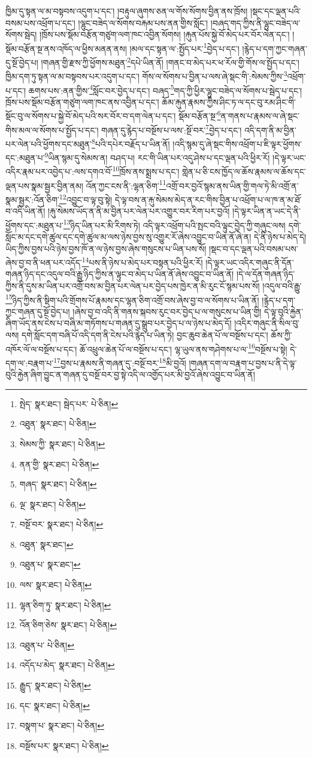 ཁྱིམ་དུ་སྟན་ལ་མ་བསྟབས་འདུག་པ་དང་། །བརྟུལ་ཞུགས་ཅན་ལ་གོས་སོགས་བྱིན་ནས་ཁྲོས། །སྡང་དང་ལྡན་པའི་བསམ་པས་འཕྲོག་པ་དང་། །ལྷུང་བཟེད་ལ་སོགས་བརྐམ་པས་ནན་གྱིས་སློང་། །བཞད་གད་ཀྱིས་ནི་ལྷུང་བཟེད་ལ་སོགས་སྦེད། །ཁྲོས་པས་སྡོམ་བརྩོན་གཙུག་ལག་ཁང་འབྱིན་སོགས། །རྐུན་པོས་སྐྱེ་བོ་མེད་པར་བོར་ལེན་དང་། །སྡོམ་བརྩོན་སྔ་ནས་འཁོད་ལ་ཕྱིས་མནན་ནས། །མལ་དང་སྟན་ལ་:སྤྱོད་པར་\footnote{སྤེད་  སྣར་ཐང་། སྦེད་པར་  པེ་ཅིན། }བྱེད་པ་དང་། །རྙེད་པ་དག་ཀྱང་གཞན་དུ་སྔོ་བྱེད་པ། །གཞན་གྱི་རྫས་ཀྱི་ཕྱོགས་མཐུན་\footnote{འཐུན་  སྣར་ཐང་།  པེ་ཅིན། }དཔེ་ཡིན་ནོ། །གནང་བ་མེད་པར་ཕ་རོལ་གྱི་གོས་ལ་སྤྱོད་པ་དང་། ཁྱིམ་དག་ཏུ་སྟན་ལ་མ་བསྟབས་པར་འདུག་པ་དང་། གོས་ལ་སོགས་པ་བྱིན་པ་ལས་ཞེ་སྡང་གི་:སེམས་ཀྱིས་\footnote{སེམས་ཀྱི་  སྣར་ཐང་།  པེ་ཅིན། }འཕྲོག་པ་དང་། ཆགས་པས་:ནན་གྱིས་\footnote{ནན་གྱི་  སྣར་ཐང་།  པེ་ཅིན། }སློང་བར་བྱེད་པ་དང་། བཞད་\footnote{གཞད་  སྣར་ཐང་།  པེ་ཅིན། }གད་ཀྱི་ཕྱིར་ལྷུང་བཟེད་ལ་སོགས་པ་སྦེད་པ་དང་། ཁྲོས་པས་སྡོམ་བརྩོན་གཙུག་ལག་ཁང་ནས་འབྱིན་པ་དང་། ཆོམ་རྐུན་རྣམས་ཀྱིས་ཤིང་ཏ་ལ་དང་བུ་རམ་ཤིང་གི་སྡོང་བུ་ལ་སོགས་པ་སྐྱེ་བོ་མེད་པའི་སར་བོར་བ་དག་ལེན་པ་དང་། སྡོམ་བརྩོན་སྔ་\footnote{ལྔ་  སྣར་ཐང་།  པེ་ཅིན། }ན་གནས་པ་རྣམས་ལ་ཞེ་སྡང་གིས་མལ་ལ་སོགས་པ་སྤྱོད་པ་དང་། གཞན་དུ་རྙེད་པ་བསྔོས་པ་ལས་:སྔོ་བར་\footnote{བསྔོ་བར་  སྣར་ཐང་།  པེ་ཅིན། }བྱེད་པ་དང་། འདི་དག་ནི་མ་བྱིན་པར་ལེན་པའི་ཕྱོགས་དང་མཐུན་\footnote{འཐུན་  སྣར་ཐང་། }པའི་དཔེར་བརྗོད་པ་ཡིན་ནོ། །འདི་སྙམ་དུ་ཞེ་སྡང་གིས་འཕྲོག་པ་ཇི་ལྟར་ཕྱོགས་དང་:མཐུན་པ་\footnote{འཐུན་པ་  སྣར་ཐང་། }ཡིན་སྙམ་དུ་སེམས་ན། བཤད་པ། རང་གི་ཡིན་པར་འདུ་ཤེས་པ་དང་ལྡན་པའི་ཕྱིར་རོ། །དེ་ལྟར་ཡང་འདིར་རྣམ་པར་འབྱེད་པ་:ལས་དགའ་བོ་\footnote{ལས་  སྣར་ཐང་།  པེ་ཅིན། }ཁྲོས་ནས་སྨྲས་པ་དང་། གླེན་པ་ཅི་ངས་ཁྱོད་ལ་ཆོས་རྣམས་ལ་ཆོས་དང་ལྡན་པས་སྣམ་སྦྱར་བྱིན་ནམ། འོན་ཀྱང་ངས་ནི་:ལྷན་ཅིག་\footnote{ལྷན་ཅིག་ཏུ་  སྣར་ཐང་།  པེ་ཅིན། }འགྲོ་བར་བྱའོ་སྙམ་ནས་ཡིན་གྱི་གལ་ཏེ་མི་འགྲོ་ན་སྣམ་སྦྱར་:འོན་ཅིག་\footnote{འོན་ཅིག་ཅེས་  སྣར་ཐང་།  པེ་ཅིན། }འབྱུང་བ་ལྟ་བུ་སྟེ། དེ་ལྟ་བས་ན་རྐུ་སེམས་མེད་ན་རང་གིས་བྱིན་པ་འཕྲོག་པ་ལ་ཁ་ན་མ་ཐོ་བ་འདི་ཡིན་ནོ། །རྐུ་སེམས་ཡོད་ན་ནི་མ་བྱིན་པར་ལེན་པར་འགྱུར་བར་རིག་པར་བྱའོ། །དེ་ལྟར་ཡིན་ན་ཡང་དེ་ནི་ཕྱོགས་དང་:མཐུན་པ་\footnote{འཐུན་པ་  པེ་ཅིན། }ཉིད་ཡིན་པར་མི་རིགས་ཏེ། འདི་ལྟར་འཕྲོག་པའི་སྤང་བའི་ལྟུང་བྱེད་ཀྱི་གཞུང་ལས། དགེ་སློང་མ་དང་དགེ་ཚུལ་དང་དགེ་ཚུལ་མ་ལས་ཉེས་བྱས་སུ་འགྱུར་རོ་ཞེས་འབྱུང་བ་ཡིན་ནོ་ཞེ་ན། དེ་ནི་ཉེས་པ་མེད་དེ། ཡིད་ཀྱིས་བྱས་པའི་ཉེས་བྱས་ཁོ་ན་ལ་ཉེས་བྱས་ཞེས་གསུངས་པ་ཡིན་པས་སོ། །སྡང་བ་དང་ལྡན་པའི་བསམ་པས་ཞེས་བྱ་བ་ནི་ཕན་པར་འདོད་\footnote{འདོད་པ་མེད་  སྣར་ཐང་།  པེ་ཅིན། }པས་ནི་ཉེས་པ་མེད་པར་བསྟན་པའི་ཕྱིར་རོ། །དེ་ལྟར་ཡང་འདིར་གཞུང་ནི་དོན་གཞན་ཉིད་དང་འདུལ་བའི་རྒྱུ་ཉིད་ཀྱིས་ན་ལྟུང་བ་མེད་པ་ཡིན་ནོ་ཞེས་འབྱུང་བ་ཡིན་ནོ། །དེ་ལ་དོན་གཞན་ཉིད་ཀྱིས་ནི་དུས་མ་ཡིན་པར་འགྲོ་བས་མ་བྱིན་པར་ལེན་པར་བྱེད་པས་ཁྱེར་ན་མི་རུང་ངོ་སྙམ་པས་སོ། །འདུལ་བའི་རྒྱུ་\footnote{རྒྱུད་  སྣར་ཐང་།  པེ་ཅིན། }ཉིད་ཀྱིས་ནི་སྡིག་པའི་གྲོགས་པོ་རྣམས་དང་ལྷན་ཅིག་འགྲོ་བས་ཞེས་བྱ་བ་ལ་སོགས་པ་ཡིན་ནོ། །རྙེད་པ་དག་ཀྱང་གཞན་དུ་སྔོ་བྱེད་པ། །ཞེས་བྱ་བ་འདི་ནི་གནས་སྐབས་རུང་བར་བྱེད་པ་ལ་གསུངས་པ་ཡིན་གྱི། དེ་ལྟ་བུའི་རྐྱེན་ཞིག་ཡོད་ནས་ངེས་པ་བཞི་མ་གཏོགས་པ་གཞན་དུ་སྒྲུབ་པར་བྱེད་པ་ལ་ཉེས་པ་མེད་དོ། །འདིར་གཞུང་ནི་སིལ་བུ་ལས། དགེ་སློང་དག་བཞི་པོ་འདི་དག་ནི་ངེས་པའི་རྙེད་པ་ཡིན་ཏེ། བྱང་ཆུབ་ཆེན་པོ་ལ་བསྔོས་པ་དང་། ཆོས་ཀྱི་འཁོར་ལོ་ལ་བསྔོས་པ་དང་། ཆོ་འཕྲུལ་ཆེན་པོ་ལ་བསྔོས་པ་དང་། ལྷ་ཡུལ་ནས་གཤེགས་པ་ལ་\footnote{དང་  སྣར་ཐང་།  པེ་ཅིན། }བསྔོས་པ་སྟེ། དེ་དག་ལ་:བརྣག་པ་\footnote{བསྣག་པ་  སྣར་ཐང་།  པེ་ཅིན། }བྱས་པ་རྣམས་ནི་གཞན་དུ་:བསྔོ་བར་\footnote{བསྔོས་པར་  སྣར་ཐང་།  པེ་ཅིན། }མི་བྱའོ། །གཞན་དག་ལ་བརྣག་པ་བྱས་པ་ནི་དེ་ལྟ་བུའི་རྐྱེན་ཞིག་བྱུང་ན་གཞན་དུ་བསྔོ་བར་བྱ་སྟེ་འདི་ལ་འགྱོད་པར་མི་བྱའོ་ཞེས་འབྱུང་བ་ཡིན་ནོ། 
